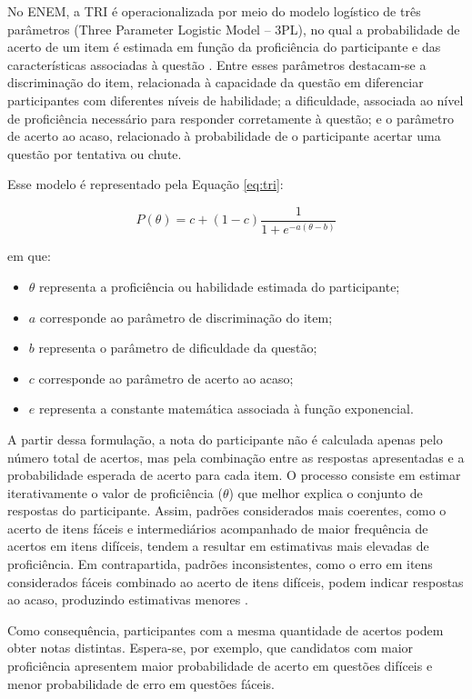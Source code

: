 \documentclass[a4paper,10pt, twocolumn]{article}
\begin{document}
No ENEM, a TRI é operacionalizada por meio do modelo logístico de três parâmetros (Three Parameter Logistic Model -- 3PL), no qual a probabilidade de acerto de um item é estimada em função da proficiência do participante e das características associadas à questão \cite{sousa_teoria_2020,inep2021enem}. Entre esses parâmetros destacam-se a discriminação do item, relacionada à capacidade da questão em diferenciar participantes com diferentes níveis de habilidade; a dificuldade, associada ao nível de proficiência necessário para responder corretamente à questão; e o parâmetro de acerto ao acaso, relacionado à probabilidade de o participante acertar uma questão por tentativa ou chute.

Esse modelo é representado pela Equação \ref{eq:tri}:

\begin{equation}
P(\theta)=c+(1-c)\frac{1}{1+e^{-a(\theta-b)}}
\label{eq:tri}
\end{equation}

em que:

\begin{itemize}
\item $\theta$ representa a proficiência ou habilidade estimada do participante;
\item $a$ corresponde ao parâmetro de discriminação do item;
\item $b$ representa o parâmetro de dificuldade da questão;
\item $c$ corresponde ao parâmetro de acerto ao acaso;
\item $e$ representa a constante matemática associada à função exponencial.
\end{itemize}

A partir dessa formulação, a nota do participante não é calculada apenas pelo número total de acertos, mas pela combinação entre as respostas apresentadas e a probabilidade esperada de acerto para cada item. O processo consiste em estimar iterativamente o valor de proficiência ($\theta$) que melhor explica o conjunto de respostas do participante. Assim, padrões considerados mais coerentes, como o acerto de itens fáceis e intermediários acompanhado de maior frequência de acertos em itens difíceis, tendem a resultar em estimativas mais elevadas de proficiência. Em contrapartida, padrões inconsistentes, como o erro em itens considerados fáceis combinado ao acerto de itens difíceis, podem indicar respostas ao acaso, produzindo estimativas menores \cite{inep2021enem}.

Como consequência, participantes com a mesma quantidade de acertos podem obter notas distintas. Espera-se, por exemplo, que candidatos com maior proficiência apresentem maior probabilidade de acerto em questões difíceis e menor probabilidade de erro em questões fáceis.
\end{document}
